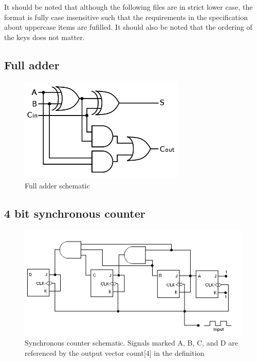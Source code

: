 \documentclass[a4paper]{article}
\begin{document}
    It should be noted that although the following files are in strict lower case, the format is fully case insensitive such that the requirements in the specification about uppercase items are fufilled.
    It should also be noted that the ordering of the keys does not matter.

    \subsection{Full adder}
        \begin{figure}[b]
            \centering
            \includegraphics[width=0.7\textwidth]{full-adder}
            \caption{Full adder schematic}
        \end{figure}
        

    \subsection{4 bit synchronous counter}
        \begin{figure}[b]
            \centering
            \includegraphics[width=\textwidth]{synchronous-counter}
            \caption{Synchronous counter schematic. Signals marked A, B, C, and D are referenced by the output vector count[4] in the definition}
        \end{figure}
        
\end{document}
